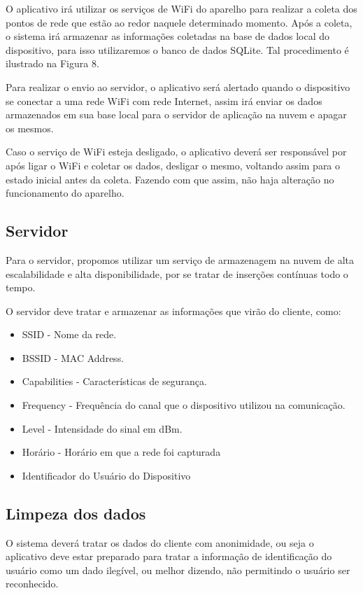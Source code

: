 \documentclass[12pt, %
openright, 
oneside,
a4paper,
brazil]{facom-ufu-abntex2}
\begin{document}
O aplicativo irá utilizar os serviços de \ac{WiFi} do aparelho para realizar a coleta dos pontos de rede que estão ao redor naquele determinado momento. Após a coleta, o sistema irá armazenar as informações coletadas na base de dados local do 	dispositivo, para isso utilizaremos o banco de dados SQLite. Tal procedimento é ilustrado na Figura 8.

Para realizar o envio ao servidor, o aplicativo será alertado quando o dispositivo se conectar a uma rede \ac{WiFi} com rede Internet, assim irá enviar os dados armazenados em sua base local para o servidor de aplicação na nuvem e apagar os mesmos. 

Caso o serviço de \ac{WiFi} esteja desligado, o aplicativo deverá ser responsável por após ligar o \ac{WiFi} e coletar os dados, desligar o mesmo, voltando assim para o estado inicial antes da coleta. Fazendo com que assim, não haja alteração no funcionamento do aparelho.




\subsection{Servidor}
Para o servidor, propomos utilizar um serviço de armazenagem na nuvem de alta escalabilidade e alta disponibilidade, por se tratar de inserções contínuas todo o tempo.

O servidor deve tratar e  armazenar as informações que virão do cliente, como:
\begin{itemize}
  \item \ac{SSID} - Nome da rede.
  \item  \ac{BSSID} - MAC Address. 
  \item Capabilities - Características de segurança. 
  \item Frequency - Frequência do canal que o dispositivo utilizou na comunicação.
  \item Level - Intensidade do sinal em \ac{dBm}.
  \item Horário - Horário em que a rede foi capturada
  \item Identificador do Usuário do Dispositivo
  \end{itemize}
  
\subsection{Limpeza dos dados}
O sistema deverá tratar os dados do cliente com anonimidade, ou seja o aplicativo deve estar preparado para tratar a informação de identificação do usuário como um dado ilegível, ou melhor dizendo, não permitindo o usuário ser reconhecido. 
\end{document}
